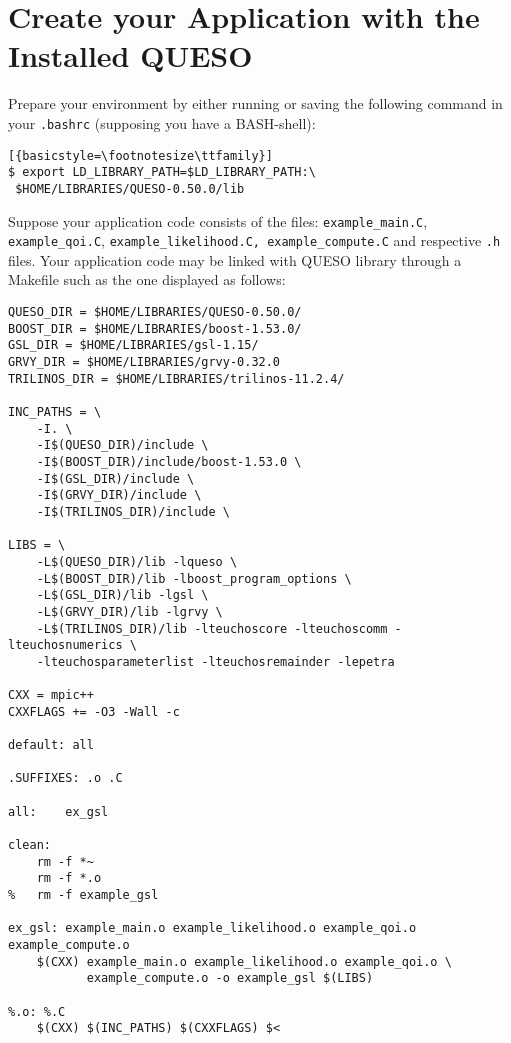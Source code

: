 \section{Create your Application with the Installed QUESO} \label{sc-use-queso}

Prepare your environment by either running or saving the following command in
your \verb+.bashrc+ (supposing you have a BASH-shell):
\begin{lstlisting}[{basicstyle=\footnotesize\ttfamily}]
$ export LD_LIBRARY_PATH=$LD_LIBRARY_PATH:\
 $HOME/LIBRARIES/QUESO-0.50.0/lib
\end{lstlisting}



Suppose your application code consists of the files:  \verb+example_main.C+,
\verb+example_qoi.C+,  \verb+example_likelihood.C, example_compute.C+ and
respective \verb+.h+ files. Your application code may be linked with QUESO
library through a Makefile such as the one displayed as follows:

\begin{lstlisting}[basicstyle={\footnotesize\ttfamily},deletekeywords={export,rm}]
QUESO_DIR = $HOME/LIBRARIES/QUESO-0.50.0/
BOOST_DIR = $HOME/LIBRARIES/boost-1.53.0/
GSL_DIR = $HOME/LIBRARIES/gsl-1.15/
GRVY_DIR = $HOME/LIBRARIES/grvy-0.32.0
TRILINOS_DIR = $HOME/LIBRARIES/trilinos-11.2.4/

INC_PATHS = \
	-I. \
	-I$(QUESO_DIR)/include \
	-I$(BOOST_DIR)/include/boost-1.53.0 \
	-I$(GSL_DIR)/include \
	-I$(GRVY_DIR)/include \
	-I$(TRILINOS_DIR)/include \

LIBS = \
	-L$(QUESO_DIR)/lib -lqueso \
	-L$(BOOST_DIR)/lib -lboost_program_options \
	-L$(GSL_DIR)/lib -lgsl \
	-L$(GRVY_DIR)/lib -lgrvy \
	-L$(TRILINOS_DIR)/lib -lteuchoscore -lteuchoscomm -lteuchosnumerics \
	-lteuchosparameterlist -lteuchosremainder -lepetra

CXX = mpic++
CXXFLAGS += -O3 -Wall -c

default: all

.SUFFIXES: .o .C

all:	ex_gsl

clean:
	rm -f *~
	rm -f *.o
% 	rm -f example_gsl

ex_gsl: example_main.o example_likelihood.o example_qoi.o example_compute.o
	$(CXX) example_main.o example_likelihood.o example_qoi.o \
	       example_compute.o -o example_gsl $(LIBS)

%.o: %.C
	$(CXX) $(INC_PATHS) $(CXXFLAGS) $<
\end{lstlisting}
% 
